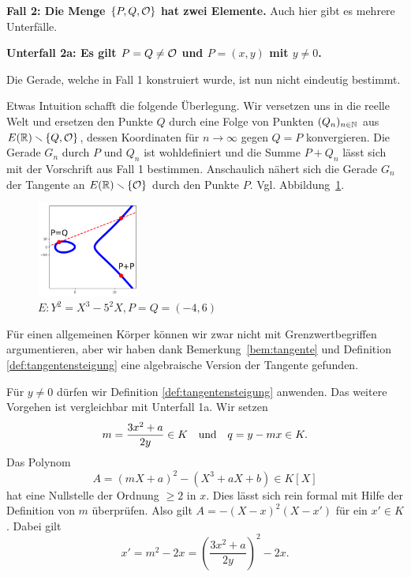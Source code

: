 \medskip
\textbf{Fall 2: Die Menge $\{P,Q,{\mathcal O}\}$ hat zwei Elemente.} Auch hier
gibt es mehrere Unterfälle.

\textbf{Unterfall 2a: Es gilt $P=Q\not={\mathcal O}$ und $P=(x,y)$ mit $y\not=0$.}

Die Gerade, welche in Fall 1 konstruiert wurde, ist nun nicht
eindeutig bestimmt.

Etwas Intuition schafft die folgende Überlegung. Wir
versetzen uns in die reelle Welt und ersetzen den Punkte $Q$ durch
eine Folge von Punkten $(Q_n)_{n\in{\mathbb{N}}}$ aus $E({\mathbb{R}})\smallsetminus\{Q,{\mathcal O}\}$, dessen
Koordinaten für $n\rightarrow\infty$ gegen $Q=P$ konvergieren.
Die Gerade $G_n$ durch $P$ und $Q_n$ ist wohldefiniert und die Summe
$P+Q_n$ lässt sich mit der Vorschrift aus Fall 1 bestimmen.
Anschaulich nähert sich die Gerade $G_n$ der Tangente an
$E({\mathbb{R}})\smallsetminus\{{\mathcal O}\}$ durch den Punkte $P$. Vgl.
Abbildung~\ref{fig:unterfall2a}. 

\begin{figure}
  \centering    
  \caption{$E: Y^2 = X^3-5^2 X,P = Q=(-4,6)$}
  \label{fig:unterfall2a}
  \includegraphics[width=0.3\textwidth]{./plots/unterfall2a.png}
\end{figure}

Für einen allgemeinen Körper können wir zwar nicht mit
Grenzwertbegriffen argumentieren, aber wir haben
dank Bemerkung~\ref{bem:tangente} und Definition
\ref{def:tangentensteigung} eine algebraische Version der Tangente
gefunden.


Für $y\not=0$ dürfen wir  Definition \ref{def:tangentensteigung}
anwenden. Das weitere Vorgehen ist vergleichbar mit Unterfall 1a.
Wir setzen
$$m =  \frac{3x^2+a}{2y}\in K\quad\text{und}\quad q = y-mx\in K.$$
Das Polynom
$$
A = (mX+a)^2 - (X^3+aX+b) \in K[X]
$$
hat  eine Nullstelle der Ordnung $\ge 2$ in $x$. Dies lässt sich
rein formal mit Hilfe der Definition von $m$ überprüfen.
Also gilt $A = -(X-x)^2(X-x')$ für ein $x'\in K$. Dabei gilt
\begin{equation*}
  x' = m^2 - 2x = \left(\frac{3x^2+a}{2y}\right)^2 - 2x. 
\end{equation*}

